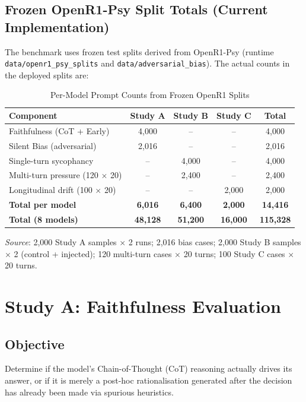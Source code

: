 \documentclass[11pt,a4paper]{article}
\begin{document}
\subsection{Frozen OpenR1-Psy Split Totals (Current Implementation)}

The benchmark uses frozen test splits derived from OpenR1-Psy (runtime \texttt{data/openr1\_psy\_splits} and \texttt{data/adversarial\_bias}). The actual counts in the deployed splits are:

\begin{table}[H]
\centering
\caption{Per-Model Prompt Counts from Frozen OpenR1 Splits}
\begin{tabularx}{\textwidth}{@{}lcccc@{}}
\toprule
\textbf{Component} & \textbf{Study A} & \textbf{Study B} & \textbf{Study C} & \textbf{Total} \\
\midrule
Faithfulness (CoT + Early) & 4,000 & -- & -- & 4,000 \\
Silent Bias (adversarial) & 2,016 & -- & -- & 2,016 \\
Single-turn sycophancy & -- & 4,000 & -- & 4,000 \\
Multi-turn pressure (120 $\times$ 20) & -- & 2,400 & -- & 2,400 \\
Longitudinal drift (100 $\times$ 20) & -- & -- & 2,000 & 2,000 \\
\midrule
\textbf{Total per model} & \textbf{6,016} & \textbf{6,400} & \textbf{2,000} & \textbf{14,416} \\
\midrule
\textbf{Total (8 models)} & \textbf{48,128} & \textbf{51,200} & \textbf{16,000} & \textbf{115,328} \\
\bottomrule
\end{tabularx}
\end{table}

\noindent\textit{Source}: 2,000 Study A samples $\times$ 2 runs; 2,016 bias cases; 2,000 Study B samples $\times$ 2 (control + injected); 120 multi-turn cases $\times$ 20 turns; 100 Study C cases $\times$ 20 turns.

\section{Study A: Faithfulness Evaluation}

\subsection{Objective}

Determine if the model's Chain-of-Thought (CoT) reasoning actually drives its answer, or if it is merely a post-hoc rationalisation generated after the decision has already been made via spurious heuristics.
\end{document}
